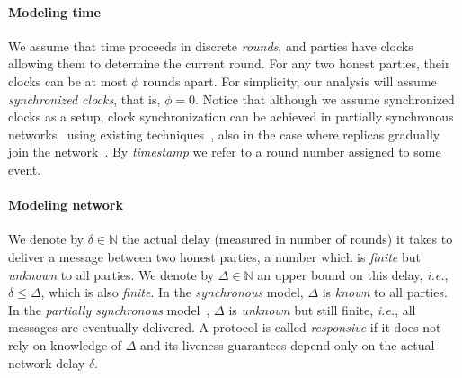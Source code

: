 \documentclass[pdflatex,sn-mathphys-num]{sn-jnl}%
\theoremstyle{thmstyleone}%
\theoremstyle{thmstyletwo}%
\theoremstyle{thmstylethree}%
\newcommand{\podtm}{\textsf{pod}\xspace}
\newcommand{\CN}{\ensuremath{\mathbb{N}}\xspace}
\newcommand{\dotparagraph}[1]{\paragraph*{#1}}
\newcommand{\tzero}{\ensuremath{t_0}\xspace}
\begin{document}
\dotparagraph{\textbf{Modeling time}}
We assume that time proceeds in discrete \emph{rounds}, and parties have clocks allowing them to determine the current round.
For any two honest parties, their clocks can be at most $\phi$ rounds apart.
For simplicity, our analysis will assume \emph{synchronized clocks}, that is, $\phi = 0$.
Notice that although we assume synchronized clocks as a setup, clock synchronization can be achieved in partially synchronous networks~\cite{psync} using existing techniques~\cite{clockoverview}, also in the case where replicas gradually join the network~\cite{bootclocksync}.
By \emph{timestamp} we refer to a round number assigned to some event.

\dotparagraph{\textbf{Modeling network}}
We denote by $\delta \in \CN$ the actual delay (measured in number of rounds) it takes to deliver a message between two honest parties,
a number which is \emph{finite} but \emph{unknown} to all parties.
We denote by $\Delta \in \CN$ an upper bound on this delay, \textit{i.e.}, $\delta \leq \Delta$, which is also \emph{finite}.
In the \emph{synchronous} model, $\Delta$ is \emph{known} to all parties.
In the \emph{partially synchronous} model~\cite{psync}, $\Delta$ is \emph{unknown} but still finite, \textit{i.e.}, all messages are eventually delivered.
A protocol is called \emph{responsive} if it does not rely on knowledge of $\Delta$ and its liveness guarantees depend only on the actual network delay $\delta$.
\end{document}
